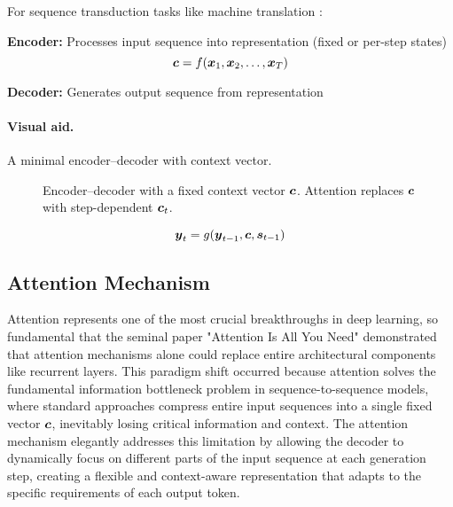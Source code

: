 For sequence transduction tasks like machine translation \cite{Cho2014,Bahdanau2014}:

\textbf{Encoder:} Processes input sequence into representation (fixed or per-step states)
\begin{equation}
\boldsymbol{c} = f(\boldsymbol{x}_1, \boldsymbol{x}_2, \ldots, \boldsymbol{x}_T)
\end{equation}

\textbf{Decoder:} Generates output sequence from representation
\paragraph{Visual aid.} A minimal encoder–decoder with context vector.
\begin{figure}[h]
    \centering
    \caption{Encoder–decoder with a fixed context vector $\boldsymbol{c}$. Attention replaces $\boldsymbol{c}$ with step-dependent $\boldsymbol{c}_t$.}
\end{figure}

\begin{equation}
\boldsymbol{y}_t = g(\boldsymbol{y}_{t-1}, \boldsymbol{c}, \boldsymbol{s}_{t-1})
\end{equation}

\subsection{Attention Mechanism}

Attention represents one of the most crucial breakthroughs in deep learning, so fundamental that the seminal paper "Attention Is All You Need" \cite{Vaswani2017} demonstrated that attention mechanisms alone could replace entire architectural components like recurrent layers. This paradigm shift occurred because attention solves the fundamental information bottleneck problem in sequence-to-sequence models, where standard approaches compress entire input sequences into a single fixed vector $\boldsymbol{c}$, inevitably losing critical information and context. The attention mechanism elegantly addresses this limitation by allowing the decoder to dynamically focus on different parts of the input sequence at each generation step, creating a flexible and context-aware representation that adapts to the specific requirements of each output token.

